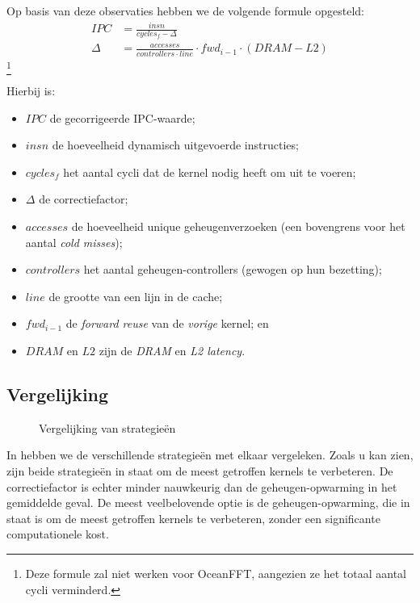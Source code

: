 \documentclass[5p,numvwe]{elsarticle}
\begin{document}
    Op basis van deze observaties hebben we de volgende formule opgesteld:
    \begin{align}
        IPC &= \frac{insn}{cycles_f - \Delta} \\
        \Delta &= \frac{accesses}{controllers \cdot line} \cdot fwd_{i-1} \cdot (DRAM - L2)
    \end{align}\footnote{Deze formule zal niet werken voor OceanFFT, aangezien ze het totaal aantal cycli verminderd.}

    Hierbij is:
    \begin{itemize}
        \item $IPC$ de gecorrigeerde IPC-waarde;
        \item $insn$ de hoeveelheid dynamisch uitgevoerde instructies;
        \item $cycles_f$ het aantal cycli dat de kernel nodig heeft om uit te voeren;
        \item $\Delta$ de correctiefactor;
        \item $accesses$ de hoeveelheid unique geheugenverzoeken (een bovengrens voor het aantal \textit{cold misses});
        \item $controllers$ het aantal geheugen-controllers (gewogen op hun bezetting);
        \item $line$ de grootte van een lijn in de cache;
        \item $fwd_{i-1}$ de \textit{forward reuse} van de \textit{vorige} kernel; en
        \item $DRAM$ en $L2$ zijn de \textit{DRAM} en \textit{L2 latency}.
    \end{itemize}

    \subsection{Vergelijking}\label{subsec:inp-vergelijk}
    \begin{figure}[hb]
        \centering
        \caption{Vergelijking van strategieën}
        \label{fig:mitig-compare}
    \end{figure}

    In  hebben we de verschillende strategieën met elkaar vergeleken.
    Zoals u kan zien, zijn beide strategieën in staat om de meest getroffen kernels te verbeteren.
    De correctiefactor is echter minder nauwkeurig dan de geheugen-opwarming in het gemiddelde geval.
    De meest veelbelovende optie is de geheugen-opwarming, die in staat is om de meest getroffen kernels te verbeteren, zonder een significante computationele kost.
\end{document}
